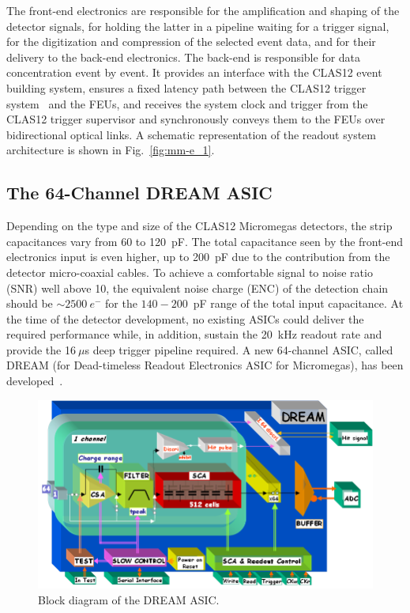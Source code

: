 The front-end electronics are responsible for the amplification and shaping of the detector signals, for holding the latter in a
pipeline waiting for a trigger signal, for the digitization and compression of the selected event data, and for their
delivery to the back-end electronics. The back-end is responsible for data concentration event by event. It provides an interface
with the CLAS12 event building system, ensures a fixed latency path between the CLAS12 trigger system~\cite{trigger-nim} 
and the FEUs, and receives the system clock and trigger from the CLAS12 trigger supervisor and synchronously conveys 
them to the FEUs over bidirectional optical links. A schematic representation of the readout system architecture is 
shown in Fig.~\ref{fig:mm-e_1}.

\subsection{The 64-Channel DREAM ASIC}

Depending on the type and size of the CLAS12 Micromegas detectors, the strip capacitances vary from 60 to 120~pF. The total
capacitance seen by the front-end electronics input is even higher, up to 200~pF due to the contribution from the detector
micro-coaxial cables. To achieve a comfortable signal to noise ratio (SNR) well above 10, the equivalent noise charge (ENC) of the
detection chain should be $\sim2500~e^-$ for the $140-200$~pF range of the total input capacitance. At the time of the
detector development, no existing ASICs could deliver the required performance while, in addition, sustain the 20~kHz readout
rate and provide the 16$~\mu$s deep trigger pipeline required. A new 64-channel ASIC, called DREAM (for Dead-timeless
Readout Electronics ASIC for Micromegas), has been developed~\cite{DRM}. 

\begin{figure}[htb]
\centering
 \includegraphics[width=.8\textwidth,keepaspectratio]{images/electronics_fig2.png}
 \caption{Block diagram of the DREAM ASIC.}
 \label{fig:mm-e_2}
\end{figure}

